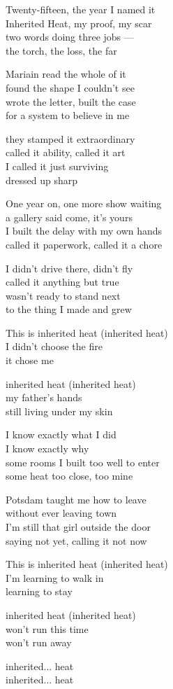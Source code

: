 \begin{lyrics}
Twenty-fifteen, the year I named it\\
Inherited Heat, my proof, my scar\\
two words doing three jobs —\\
the torch, the loss, the far

Mariain read the whole of it\\
found the shape I couldn't see\\
wrote the letter, built the case\\
for a system to believe in me

they stamped it extraordinary\\
called it ability, called it art\\
I called it just surviving\\
dressed up sharp

One year on, one more show waiting\\
a gallery said come, it's yours\\
I built the delay with my own hands\\
called it paperwork, called it a chore

I didn't drive there, didn't fly\\
called it anything but true\\
wasn't ready to stand next\\
to the thing I made and grew

This is inherited heat
(inherited heat)\\
I didn't choose the fire\\
it chose me

inherited heat
(inherited heat)\\
my father's hands\\
still living under my skin

I know exactly what I did\\
I know exactly why\\
some rooms I built too well to enter\\
some heat too close, too mine

Potsdam taught me how to leave\\
without ever leaving town\\
I'm still that girl outside the door\\
saying not yet, calling it not now

This is inherited heat
(inherited heat)\\
I'm learning to walk in\\
learning to stay

inherited heat
(inherited heat)\\
won't run this time\\
won't run away

inherited... heat\\
inherited... heat
\end{lyrics}

